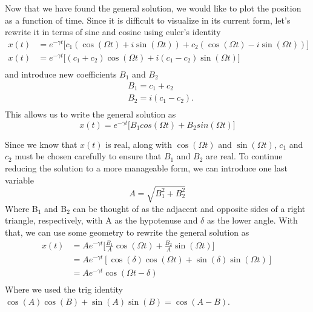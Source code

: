 \documentclass{article}
\newcommand{\be}{\begin{equation}}
\newcommand{\ee}{\end{equation}}
\begin{document}
Now that we have found the general solution, we would like to plot the position as a function of time.
Since it is difficult to visualize in its current form, let's rewrite it in terms of sine and cosine using euler's identity
\be
\begin{split}
x(t) &= e^{-\gamma t} \big[ c_1(\cos(\Omega t) + i \sin(\Omega t)) + c_2(\cos(\Omega t) - i \sin(\Omega t)) \big] \\
x(t) &= e^{-\gamma t} \big[ (c_1 + c_2)\cos(\Omega t) + i(c_1 - c_2)\sin(\Omega t) \big] \\
\end{split}
\ee
and introduce new coefficients $B_1$ and $B_2$
\be
\begin{split}
&B_1 = c_1 + c_2 \\
&B_2 = i(c_1 - c_2) . \\
\end{split}
\ee
This allows us to write the general solution as
\be
x(t) = e^{-\gamma t} \big[ B_1 cos(\Omega t) + B_2 sin(\Omega t)]
\ee

Since we know that $x(t)$ is real, along with $\cos(\Omega t)$ and $\sin(\Omega t)$, $c_1$ and $c_2$ must be chosen carefully to ensure that $B_1$ and $B_2$ are real.
To continue reducing the solution to a more manageable form, we can introduce one last variable
\be
A = \sqrt{B_1^2 + B_2^2}
\ee
Where B$_1$ and B$_2$ can be thought of as the adjacent and opposite sides of a right triangle, respectively, with A as the hypotenuse and $\delta$ as the lower angle.
With that, we can use some geometry to rewrite the general solution as
\be
\begin{split}
x(t) &= Ae^{-\gamma t} \Big[\frac{B_1}{A}\cos(\Omega t) + \frac{B_2}{A}\sin(\Omega t) \Big]\\
 &= Ae^{-\gamma t} [\cos(\delta)\cos(\Omega t) + \sin(\delta)\sin(\Omega t)]\\
 &= Ae^{-\gamma t} \cos(\Omega t - \delta)\\
\end{split}
\ee
Where we used the trig identity $\cos(A)\cos(B) + \sin(A)\sin(B) = \cos(A-B)$.
\end{document}
